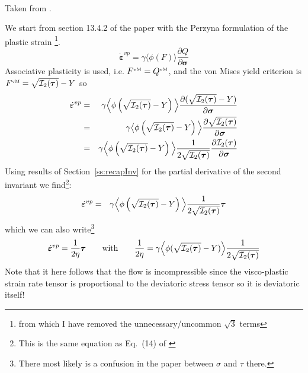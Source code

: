 \begin{center}
\\
{\captionfont Taken from \textcite{zien75}.}
\end{center}

We start from section 13.4.2 of the paper with the Perzyna formulation of the plastic strain
\footnote{from which I have removed the unnecessary/uncommon $\sqrt 3$ terms}. 
\[
\dot{\bm \varepsilon}^{vp} = \gamma \langle \phi(F) \rangle \frac{\partial Q}{\partial \bm\sigma}
\]
Associative plasticity is used, i.e. $F^{\text{\tiny vM}}=Q^{\text{\tiny vM}}$, and the von Mises yield
criterion is $F^{\text{\tiny vM}}=\sqrt{{\cal I}_2(\bm \tau)}- Y$ so
\begin{eqnarray}
\dot{\bm \varepsilon}^{vp} 
&=& \gamma \Big\langle \phi\left(\sqrt{{\cal I}_2(\bm \tau)}- Y\right)  \Big\rangle 
\frac{\partial (\sqrt{{\cal I}_2(\bm \tau)}- Y)}{\partial \bm\sigma} \nonumber\\
&=& \gamma \big\langle \phi\left(\sqrt{{\cal I}_2(\bm \tau)}- Y\right)  \Big\rangle 
\frac{\partial \sqrt{{\cal I}_2(\bm \tau)}}{\partial \bm\sigma} \nonumber\\
&=& \gamma \Big\langle \phi\left(\sqrt{{\cal I}_2(\bm \tau)}- Y\right)  \Big\rangle 
\frac{1}{2 \sqrt{{\cal I}_2(\bm \tau)}} \frac{\partial {\cal I}_2(\bm \tau)}{\partial \bm\sigma}
\end{eqnarray}
Using results of Section~\ref{ss:recapInv} for the partial derivative of the second invariant
we find\footnote{This is the same equation as Eq.~(14) of 
\textcite{zijo78}}:
\begin{eqnarray}
\dot{\bm \varepsilon}^{vp} 
&=& \gamma \Big\langle \phi\left(\sqrt{{\cal I}_2(\bm \tau)}- Y \right)  \Big\rangle 
\frac{1}{2 \sqrt{{\cal I}_2(\bm \tau)}} {\bm \tau}
\end{eqnarray}
which we can also write\footnote{There most likely is a confusion in 
the paper between $\sigma$ and $\tau$ there.}
\[
\dot{\bm \varepsilon}^{vp} =
\frac{1}{2\eta} \bm\tau
\qquad
{\rm with}
\qquad
\frac{1}{2\eta} = \gamma \Big\langle \phi(\sqrt{{\cal I}_2(\bm \tau)}- Y) \Big\rangle 
\frac{1}{2 \sqrt{{\cal I}_2(\bm \tau)}}
\]
Note that it here follows that the flow is incompressible since 
the visco-plastic strain rate tensor is proportional to the deviatoric stress tensor
so it is deviatoric itself!

